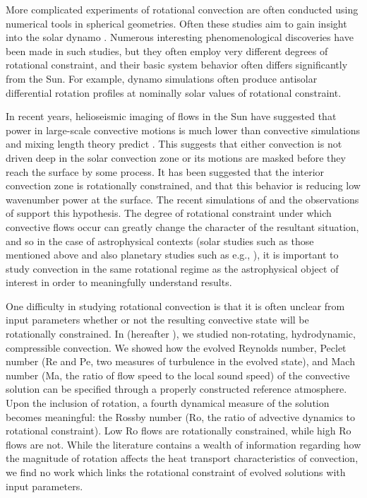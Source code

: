 \documentclass[twocolumn, amsmath, amsfonts, amssymb]{aastex62}
\begin{document}
More complicated experiments of rotational convection are often conducted
using numerical tools in spherical geometries. Often these studies aim to
gain insight into the solar dynamo \citep{glatzmaier&gilman1982, busse2002, brown&all2008,
brown&all2010, brown&all2011, augustson&all2012, guerrero&all2013, kapyla&all2014}.
Numerous interesting phenomenological discoveries have been made in such studies,
but they often employ very different degrees of rotational constraint, and their
basic system behavior often differs significantly from the Sun. For example, 
dynamo simulations often produce antisolar differential rotation profiles at
nominally solar values of rotational constraint.

In recent years, helioseismic imaging of flows in the Sun have suggested that
power in large-scale convective motions is much lower than convective simulations
and mixing length theory predict \citep{hanasoge&all2012, greer&all2015L}.
This suggests that either convection is not driven deep in the solar convection
zone or its motions are masked before they reach the surface by some process.
It has been suggested that the
interior convection zone is rotationally constrained, and that this behavior is
reducing low wavenumber power at the surface. The recent simulations of
\cite{featherstone&hindman2016} and the observations of \cite{greer&all2016} 
support this hypothesis.  The degree of rotational constraint
under which convective flows occur can greatly change the character of the
resultant situation, and so in the case of astrophysical contexts (solar studies
such as those mentioned above and also planetary studies such as e.g., 
\cite{soderlund&all2015}), it is important to study convection in the same
rotational regime as the astrophysical object of interest in order to meaningfully
understand results.

One difficulty in studying rotational convection is that it is often unclear
from input parameters whether or not the resulting convective state will be rotationally
constrained. In \cite{anders&brown2017} (hereafter \AB), we studied non-rotating, hydrodynamic, 
compressible convection. We showed how the evolved Reynolds number, Peclet number
(Re and Pe, two measures of turbulence in the evolved state), and Mach number
(Ma, the ratio of flow speed to the local sound speed) of the convective solution
can be specified through a properly constructed reference atmosphere. Upon the inclusion
of rotation, a fourth dynamical measure of the solution becomes meaningful: the
Rossby number (Ro, the ratio of advective dynamics to rotational constraint). Low
Ro flows are rotationally constrained, while high Ro flows are not. While the literature
contains a wealth of information regarding how the magnitude of rotation affects the
heat transport characteristics of convection, we find no work which links
the rotational constraint of evolved solutions with input parameters.
\end{document}
